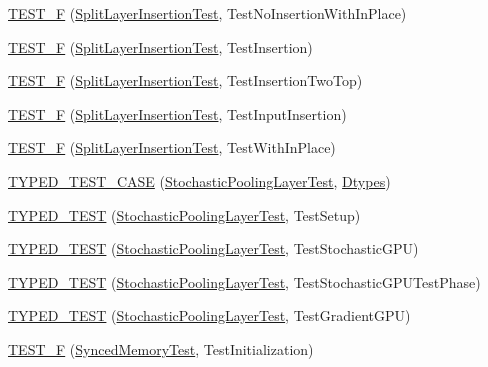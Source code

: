 \begin{DoxyCompactItemize}
\hyperlink{namespacecaffe_a814e51fee4f23c7b6a2582f786444272}{T\+E\+S\+T\+\_\+\+F} (\hyperlink{classcaffe_1_1_split_layer_insertion_test}{Split\+Layer\+Insertion\+Test}, Test\+No\+Insertion\+With\+In\+Place)
\item 
\hyperlink{namespacecaffe_a089ae543e18802449cf2622e2f518a00}{T\+E\+S\+T\+\_\+\+F} (\hyperlink{classcaffe_1_1_split_layer_insertion_test}{Split\+Layer\+Insertion\+Test}, Test\+Insertion)
\item 
\hyperlink{namespacecaffe_aebdf7779d31baa8f925fe3f8998ad73c}{T\+E\+S\+T\+\_\+\+F} (\hyperlink{classcaffe_1_1_split_layer_insertion_test}{Split\+Layer\+Insertion\+Test}, Test\+Insertion\+Two\+Top)
\item 
\hyperlink{namespacecaffe_adcfa63a43a43ba9fd550337a8f3ab439}{T\+E\+S\+T\+\_\+\+F} (\hyperlink{classcaffe_1_1_split_layer_insertion_test}{Split\+Layer\+Insertion\+Test}, Test\+Input\+Insertion)
\item 
\hyperlink{namespacecaffe_a871ea8f68a97aca1111c186180edff62}{T\+E\+S\+T\+\_\+\+F} (\hyperlink{classcaffe_1_1_split_layer_insertion_test}{Split\+Layer\+Insertion\+Test}, Test\+With\+In\+Place)
\item 
\hyperlink{namespacecaffe_a5f5eac56fab0875c045a5cac0c4f3421}{T\+Y\+P\+E\+D\+\_\+\+T\+E\+S\+T\+\_\+\+C\+A\+S\+E} (\hyperlink{classcaffe_1_1_stochastic_pooling_layer_test}{Stochastic\+Pooling\+Layer\+Test}, \hyperlink{namespacecaffe_a131dc2be50f2f10e18450da61cde6b57}{Dtypes})
\item 
\hyperlink{namespacecaffe_a07698679bc27077bf015a857056f2cee}{T\+Y\+P\+E\+D\+\_\+\+T\+E\+S\+T} (\hyperlink{classcaffe_1_1_stochastic_pooling_layer_test}{Stochastic\+Pooling\+Layer\+Test}, Test\+Setup)
\item 
\hyperlink{namespacecaffe_a8eb46cbe93abe5613f7e4c37e42ab5fa}{T\+Y\+P\+E\+D\+\_\+\+T\+E\+S\+T} (\hyperlink{classcaffe_1_1_stochastic_pooling_layer_test}{Stochastic\+Pooling\+Layer\+Test}, Test\+Stochastic\+G\+P\+U)
\item 
\hyperlink{namespacecaffe_a2b37b3ad812689a7e4ab59be77f5c15e}{T\+Y\+P\+E\+D\+\_\+\+T\+E\+S\+T} (\hyperlink{classcaffe_1_1_stochastic_pooling_layer_test}{Stochastic\+Pooling\+Layer\+Test}, Test\+Stochastic\+G\+P\+U\+Test\+Phase)
\item 
\hyperlink{namespacecaffe_aa659160dd419e5020eee30ff41b08b67}{T\+Y\+P\+E\+D\+\_\+\+T\+E\+S\+T} (\hyperlink{classcaffe_1_1_stochastic_pooling_layer_test}{Stochastic\+Pooling\+Layer\+Test}, Test\+Gradient\+G\+P\+U)
\item 
\hyperlink{namespacecaffe_ad28ed8bb2aee5fae7e731142aaf7ef8a}{T\+E\+S\+T\+\_\+\+F} (\hyperlink{classcaffe_1_1_synced_memory_test}{Synced\+Memory\+Test}, Test\+Initialization)

\end{DoxyCompactItemize}
